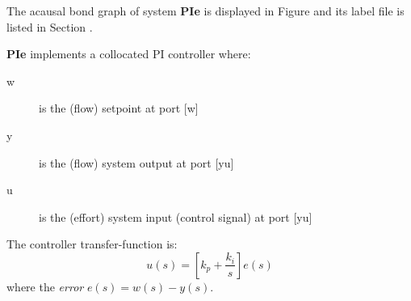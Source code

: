 

   The acausal bond graph of system \textbf{PIe} is
   displayed in Figure  and its label
   file is listed in Section .

\textbf{PIe} implements a collocated PI controller where:
\begin{description}
\item[w] is the (flow) setpoint at port [w]
\item[y] is the (flow) system output at port [yu]
\item[u] is the (effort) system input (control signal) at port [yu]
\end{description}

The controller transfer-function is:
\begin{equation}
  u(s) = \left [ k_p + \frac{k_i}{s} \right ] e(s) 
\end{equation}
where the \emph{error} $e(s) = w(s) - y(s)$.